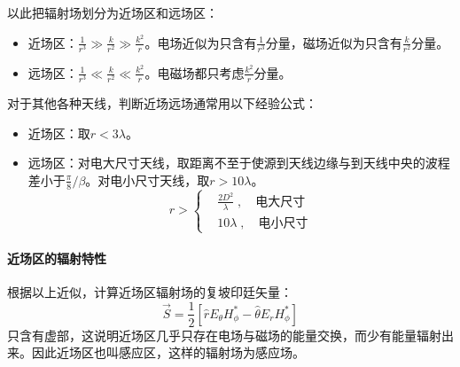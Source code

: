         以此把辐射场划分为近场区和远场区：
        \begin{itemize}
            \item 近场区：$\frac{1}{r^3}\gg\frac{k}{r^2}\gg\frac{k^2}{r}$。电场近似为只含有$\frac{1}{r^3}$分量，磁场近似为只含有$\frac{k}{r^2}$分量。
            \item 远场区：$\frac{1}{r^3}\ll\frac{k}{r^2}\ll\frac{k^2}{r}$。电磁场都只考虑$\frac{k^2}{r}$分量。
        \end{itemize}
        对于其他各种天线，判断近场远场通常用以下经验公式：
        \begin{itemize}
            \item 近场区：取$r<3 \lambda$。
            \item 远场区：对电大尺寸天线，取距离不至于使源到天线边缘与到天线中央的波程差小于$\frac{\pi}{8}/\beta$。对电小尺寸天线，取$r>10 \lambda$。
                \begin{equation}
                    r>
                    \left\{\begin{aligned}
                        &\frac{2D^2}{\lambda}\;,\quad \mbox{电大尺寸}\\
                        &10 \lambda\;,\quad \mbox{电小尺寸}
                    \end{aligned}\right.
                \end{equation}
        \end{itemize}

        \paragraph*{近场区的辐射特性}
        根据以上近似，计算近场区辐射场的复坡印廷矢量：
        \begin{equation}
            \vec{S}
            = \frac{1}{2}\left[\hat{r}E_\theta H_\phi^*-\hat{\theta}E_r H_\phi^*\right]
        \end{equation}
        只含有虚部，这说明近场区几乎只存在电场与磁场的能量交换，而少有能量辐射出来。因此近场区也叫感应区，这样的辐射场为感应场。

